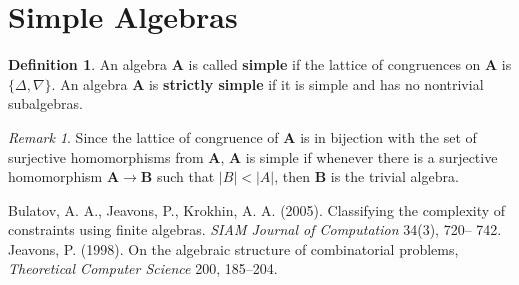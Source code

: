 \documentclass{amsart}
\theoremstyle{plain}
\theoremstyle{definition}
\newtheorem{definition}[theorem]{Definition}
\theoremstyle{remark}
\newtheorem{remark}[theorem]{Remark}
\begin{document}
\section{Simple Algebras}
\begin{definition}
    An algebra $\mathbf{A}$ is called \textbf{simple} if the lattice of congruences on $\mathbf{A}$ is $\{\Delta, \nabla \}$. 
    An algebra $\mathbf{A}$ is \textbf{strictly simple} if it is simple and has no nontrivial subalgebras. 
\end{definition}

\begin{remark}
    Since the lattice of congruence of $\mathbf{A}$ is in bijection with the set of surjective homomorphisms from $\mathbf{A}$, 
    $\mathbf{A}$ is simple if whenever there is a surjective homomorphism $\mathbf{A} \to \mathbf{B}$ such that $|B| < |A|$, then $\mathbf{B}$ is the trivial algebra. 
\end{remark}


\begin{thebibliography}{9}
    Bulatov, A. A.,  Jeavons, P., Krokhin, A. A. (2005). Classifying the complexity of constraints using finite algebras. \emph{SIAM Journal of Computation} 34(3), 720– 742.
    Jeavons, P. (1998). On the algebraic structure of combinatorial problems, \emph{Theoretical Computer Science} 200, 185–204.
 \end{thebibliography}
\end{document}

